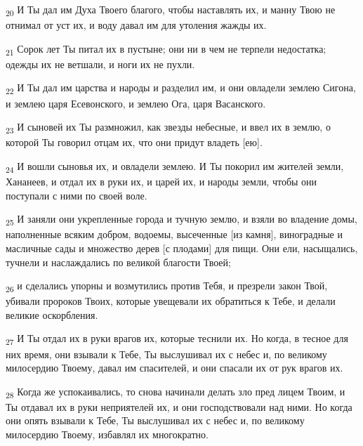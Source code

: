 \begin{tcolorbox}
\textsubscript{20} И Ты дал им Духа Твоего благого, чтобы наставлять их, и манну Твою не отнимал от уст их, и воду давал им для утоления жажды их.
\end{tcolorbox}
\begin{tcolorbox}
\textsubscript{21} Сорок лет Ты питал их в пустыне; они ни в чем не терпели недостатка; одежды их не ветшали, и ноги их не пухли.
\end{tcolorbox}
\begin{tcolorbox}
\textsubscript{22} И Ты дал им царства и народы и разделил им, и они овладели землею Сигона, и землею царя Есевонского, и землею Ога, царя Васанского.
\end{tcolorbox}
\begin{tcolorbox}
\textsubscript{23} И сыновей их Ты размножил, как звезды небесные, и ввел их в землю, о которой Ты говорил отцам их, что они придут владеть [ею].
\end{tcolorbox}
\begin{tcolorbox}
\textsubscript{24} И вошли сыновья их, и овладели землею. И Ты покорил им жителей земли, Хананеев, и отдал их в руки их, и царей их, и народы земли, чтобы они поступали с ними по своей воле.
\end{tcolorbox}
\begin{tcolorbox}
\textsubscript{25} И заняли они укрепленные города и тучную землю, и взяли во владение домы, наполненные всяким добром, водоемы, высеченные [из камня], виноградные и масличные сады и множество дерев [с плодами] для пищи. Они ели, насыщались, тучнели и наслаждались по великой благости Твоей;
\end{tcolorbox}
\begin{tcolorbox}
\textsubscript{26} и сделались упорны и возмутились против Тебя, и презрели закон Твой, убивали пророков Твоих, которые увещевали их обратиться к Тебе, и делали великие оскорбления.
\end{tcolorbox}
\begin{tcolorbox}
\textsubscript{27} И Ты отдал их в руки врагов их, которые теснили их. Но когда, в тесное для них время, они взывали к Тебе, Ты выслушивал их с небес и, по великому милосердию Твоему, давал им спасителей, и они спасали их от рук врагов их.
\end{tcolorbox}
\begin{tcolorbox}
\textsubscript{28} Когда же успокаивались, то снова начинали делать зло пред лицем Твоим, и Ты отдавал их в руки неприятелей их, и они господствовали над ними. Но когда они опять взывали к Тебе, Ты выслушивал их с небес и, по великому милосердию Твоему, избавлял их многократно.
\end{tcolorbox}
